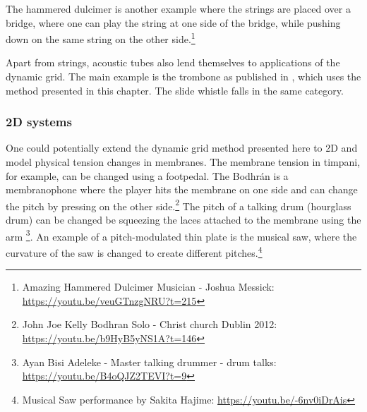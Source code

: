 The hammered dulcimer is another example where the strings are placed over a bridge, where one can play the string at one side of the bridge, while pushing down on the same string on the other side.\footnote{Amazing Hammered Dulcimer Musician - Joshua Messick: \url{https://youtu.be/veuGTnzgNRU?t=215}}

Apart from strings, acoustic tubes also lend themselves to applications of the dynamic grid. The main example is the trombone as published in \citeP[H], which uses the method presented in this chapter. The slide whistle falls in the same category. 

\subsubsection{2D systems}
One could potentially extend the dynamic grid method presented here to 2D and model physical tension changes in membranes. The membrane tension in timpani, for example, can be changed using a footpedal. The Bodhr\'an is a membranophone where the player hits the membrane on one side and can change the pitch by pressing on the other side.\footnote{John Joe Kelly Bodhran Solo - Christ church Dublin 2012: \url{https://youtu.be/b9HyB5yNS1A?t=146}} The pitch of a talking drum (hourglass drum) can be changed be squeezing the laces attached to the membrane using the arm \footnote{Ayan Bisi Adeleke - Master talking drummer - drum talks: \url{https://youtu.be/B4oQJZ2TEVI?t=9}}. An example of a pitch-modulated thin plate is the musical saw, where the curvature of the saw is changed to create different pitches.\footnote{Musical Saw performance by Sakita Hajime: \url{https://youtu.be/-6nv0iDrAis}}







